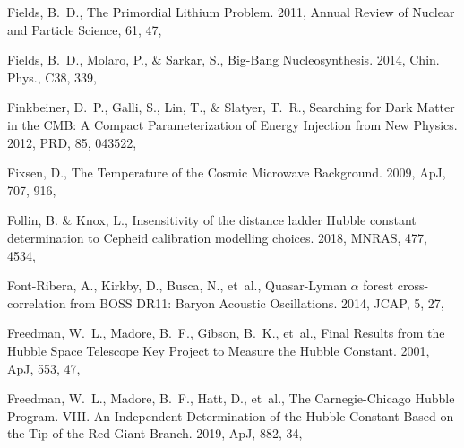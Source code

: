 \documentclass[longauth,traditabstract]{aa}
\def\apj{{ApJ}}
\def\mnras{{MNRAS}}
\def\prd{{PRD}}
\def\jcap{{JCAP}}
\begin{document}
\begin{thebibliography}{379}
{Fields}, B.~D., {The Primordial Lithium Problem}. 2011, Annual Review of
  Nuclear and Particle Science, 61, 47, 

Fields, B.~D., Molaro, P., \& Sarkar, S., {Big-Bang Nucleosynthesis}. 2014,
  Chin. Phys., C38, 339, 

Finkbeiner, D.~P., Galli, S., Lin, T., \& Slatyer, T.~R., {Searching for Dark
  Matter in the CMB: A Compact Parameterization of Energy Injection from New
  Physics}. 2012, \prd, 85, 043522, 

Fixsen, D., {The Temperature of the Cosmic Microwave Background}. 2009, \apj,
  707, 916, 

Follin, B. \& Knox, L., {Insensitivity of the distance ladder Hubble constant
  determination to Cepheid calibration modelling choices}. 2018, \mnras, 477,
  4534, 

{Font-Ribera}, A., {Kirkby}, D., {Busca}, N., {et~al.}, {Quasar-Lyman
  {$\alpha$} forest cross-correlation from BOSS DR11: Baryon Acoustic
  Oscillations}. 2014, \jcap, 5, 27, 

{Freedman}, W.~L., {Madore}, B.~F., {Gibson}, B.~K., {et~al.}, {Final Results
  from the Hubble Space Telescope Key Project to Measure the Hubble Constant}.
  2001, \apj, 553, 47, 

{Freedman}, W.~L., {Madore}, B.~F., {Hatt}, D., {et~al.}, {The Carnegie-Chicago
  Hubble Program. VIII. An Independent Determination of the Hubble Constant
  Based on the Tip of the Red Giant Branch}. 2019, \apj, 882, 34,


\end{thebibliography}
\end{document}
